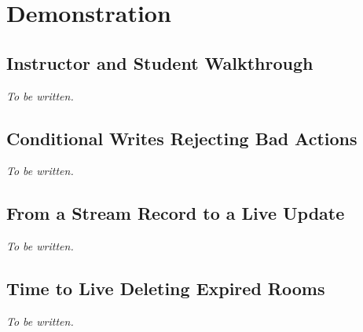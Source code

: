
\section{Demonstration}\label{sec:demo}

\subsection{Instructor and Student Walkthrough}

\textit{To be written.}

\subsection{Conditional Writes Rejecting Bad Actions}

\textit{To be written.}

\subsection{From a Stream Record to a Live Update}

\textit{To be written.}

\subsection{Time to Live Deleting Expired Rooms}

\textit{To be written.}
